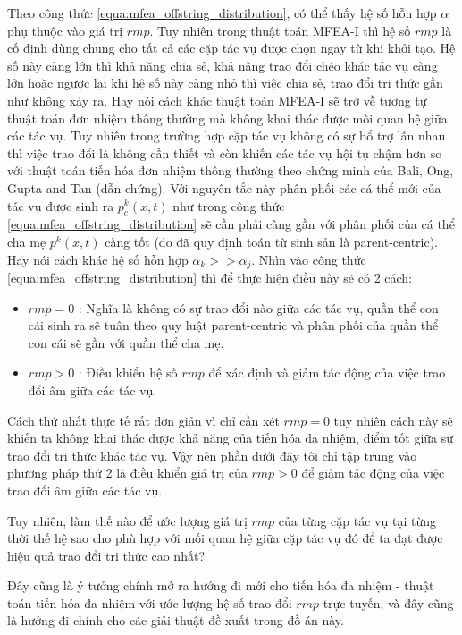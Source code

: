 Theo công thức \ref{equa:mfea_offstring_distribution}, có thể thấy hệ số hỗn hợp $\alpha$ phụ thuộc vào giá trị $rmp$. Tuy nhiên trong thuật toán MFEA-I thì hệ số $rmp$ là cố định dùng chung cho tất cả các cặp tác vụ được chọn ngay từ khi khởi tạo. Hệ số này càng lớn thì khả năng chia sẻ, khả năng trao đổi chéo khác tác vụ càng lớn  hoặc ngược lại khi hệ số này càng nhỏ thì việc chia sẻ, trao đổi tri thức gần như không xảy ra. Hay nói cách khác thuật toán MFEA-I sẽ trở về tương tự thuật toán đơn nhiệm thông thường mà không khai thác được mối quan hệ giữa các tác vụ. Tuy nhiên trong trường hợp cặp tác vụ không có sự bổ trợ lẫn nhau thì việc trao đổi là không cần thiết và còn khiến các tác vụ hội tụ chậm hơn so với thuật toán tiến hóa đơn nhiệm thông thường theo chứng minh của Bali, Ong, Gupta and Tan (dẫn chứng).
Với nguyên tắc này phân phối các cá thể mới của tác vụ được sinh ra $p_c^k(x,t)$ như trong công thức \ref{equa:mfea_offstring_distribution} sẽ cần phải càng gần với phân phối của cá thể cha mẹ $p^k(x,t)$ càng tốt (do đã quy định toán từ sinh sản là parent-centric). Hay nói cách khác hệ số hỗn hợp $\alpha_k >> \alpha_j$.
Nhìn vào công thức \ref{equa:mfea_offstring_distribution} thì để thực hiện điều này sẽ có 2 cách:
\begin{itemize}
    \item $rmp = 0$ : Nghĩa là không có sự trao đổi nào giữa các tác vụ, quần thể con cái sinh ra sẽ tuân theo quy luật parent-centric và phân phối của quần thể con cái sẽ gần với quần thể cha mẹ.
    \item $rmp > 0$ : Điều khiển hệ số $rmp$ để xác định và giảm tác động của việc trao đổi âm giữa các tác vụ.
\end{itemize}
Cách thứ nhất thực tế rất đơn giản vì chỉ cần xét $rmp = 0$ tuy nhiên cách này sẽ khiến ta không khai thác được khả năng của tiến hóa đa nhiệm, điểm tốt giữa sự trao đổi tri thức khác tác vụ. Vậy nên phần dưới đây tôi chỉ tập trung vào phương pháp thứ 2 là điều khiển giá trị của $rmp > 0$ để giảm tác động của việc trao đổi âm giữa các tác vụ.

Tuy nhiên, làm thế nào để ước lượng giá trị $rmp$ của từng cặp tác vụ tại từng thời thế hệ sao cho phù hợp với mối quan hệ giữa cặp tác vụ đó để ta đạt được hiệu quả trao đổi tri thức cao nhất? 

Đây cũng là ý tưởng chính mở ra hướng đi mới cho tiến hóa đa nhiệm - thuật toán tiến hóa đa nhiệm với ước lượng hệ số trao đổi $rmp$ trực tuyến, và đây cũng là hướng đi chính cho các giải thuật đề xuất trong đồ án này.
